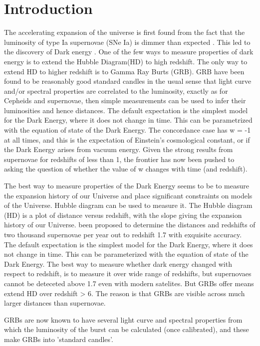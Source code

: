 \section{Introduction}
The accelerating expansion of the universe is first found from the fact that the luminosity of type Ia supernovae (SNe Ia) is dimmer than expected \cite{riess1998observational}. This led to the discovery of Dark energy \cite{perlmutter1999measurements}. One of the few ways to measure properties of dark energy is to extend the Hubble Diagram(HD) to high redshift. The only way to extend HD to higher redshift is to Gamma Ray Burts (GRB). GRB have been found to be reasonably good standard candles in the usual sense that light curve and/or spectral properties are correlated to the luminosity, exactly as for Cepheids and supernovae, then simple measurements can be used to infer their luminosities and hence distances. The default expectation is the simplest model for the Dark Energy, where it does not change in time. This can be parametrized with the equation of state of the Dark Energy. The concordance case has w = -1 at all times, and this is the expectation of Einstein’s cosmological constant, or if the Dark Energy arises from vacuum energy. Given the strong results from supernovae for redshifts of less than 1, the frontier has now been pushed to asking the question of whether the value of w changes with time (and redshift).

The best way to measure properties of the Dark Energy seems to be to measure the expansion history of our Universe and place significant constraints on models of the Universe. Hubble diagram can be used to measure it. The Hubble diagram (HD) is a plot of distance versus redshift, with the slope giving the expansion history of our Universe. been proposed to determine the distances and redshifts of two thousand supernovae per year out to redshift 1.7 with exquisite accuracy. The default expectation is the simplest model for the Dark Energy, where it does not change in time. This can be parameterized with the equation of state of the Dark Energy. The best way to measure whether dark energy changed with respect to redshift, is to measure it over wide range of redshifts, but supernovaes cannot be deteceted above 1.7 even with modern satelites. But GRBs offer means extend HD over redshift > 6. The reason is that GRBs are visible across much larger distances than supernovae.

GRBs are now known to have several light curve and spectral properties from which the luminosity of the burst can be calculated (once calibrated), and these make GRBs into ’standard candles’.